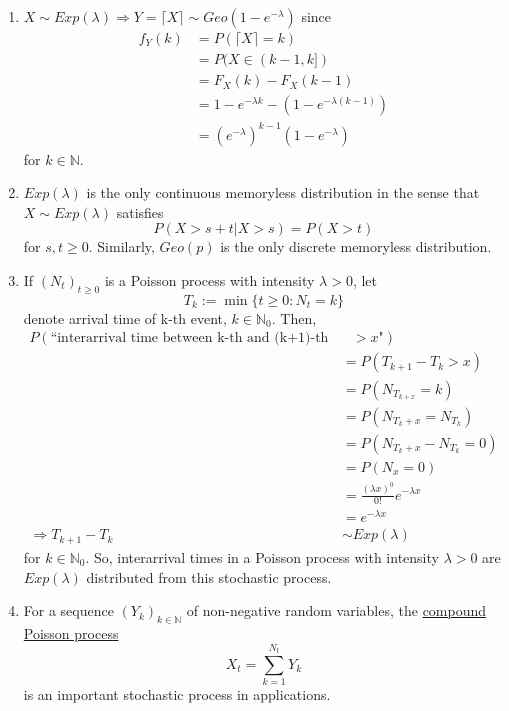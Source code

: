 \documentclass{article}
\newcommand{\N}{\mathbb{N}}
\begin{document}
\begin{itemize}
\begin{myrem*}{}{}
\begin{enumerate}
						\item $X\sim Exp(\lambda)\Rightarrow Y=\lceil X\rceil\sim Geo(1-e^{-\lambda})$ since
						\begin{align*}
							f_Y(k)&=P(\lceil X\rceil=k)\\
							&=P(X\in(k-1, k])\\
							&=F_X(k)-F_X(k-1)\\
							&=1-e^{-\lambda k}-(1-e^{-\lambda(k-1)})\\
							&=(e^{-\lambda})^{k-1}(1-e^{-\lambda})
						\end{align*}
						for $k\in\N$.
						
						\item $Exp(\lambda)$ is the only continuous memoryless distribution in the sense that $X\sim Exp(\lambda)$ satisfies $$P(X>s+t | X>s)=P(X>t)$$ for $s, t\geq0$. Similarly, $Geo(p)$ is the only discrete memoryless distribution.
						
						\item If $(N_t)_{t\geq0}$ is a Poisson process with intensity $\lambda>0$, let $$T_k:=\min\{t\geq0 : N_t=k\}$$ denote arrival time of k-th event, $k\in\N_0$. Then,
						\begin{align*}
							P(\mbox{``interarrival time between k-th and (k+1)-th event is $>x$"})\\
							&=P(T_{k+1}-T_{k}>x)\\
							&=P(N_{T_{k+x}}=k)\\
							&=P(N_{T_{k}+x}=N_{T_k})\\
							&=P(N_{T_{k}+x}-N_{T_k}=0)\\
							&=P(N_x=0)\\
							&=\frac{(\lambda x)^0}{0!}e^{-\lambda x}\\
							&=e^{-\lambda x}\\
							\Rightarrow T_{k+1}-T_k&\sim Exp(\lambda)
						\end{align*}
						for $k\in\N_0$. So, interarrival times in a Poisson process with intensity $\lambda>0$ are $Exp(\lambda)$ distributed from this stochastic process.
						
						\item For a sequence $(Y_k)_{k\in\N}$ of non-negative random variables, the \ul{compound Poisson process} $$X_t=\sum_{k=1}^{N_t}Y_k$$ is an important stochastic process in applications.
					\end{enumerate}
				\end{myrem*}
			\end{itemize}
			
\end{document}
